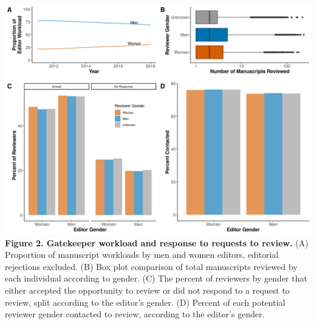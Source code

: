 \documentclass[11pt,]{article}
\begin{document}
\newpage

\includegraphics{Figure_2.png} \textbf{Figure 2. Gatekeeper workload and
response to requests to review.} (A) Proportion of manuscript workloads
by men and women editors, editorial rejections excluded. (B) Box plot
comparison of total manuscripts reviewed by each individual according to
gender. (C) The percent of reviewers by gender that either accepted the
opportunity to review or did not respond to a request to review, split
according to the editor's gender. (D) Percent of each potential reviewer
gender contacted to review, according to the editor's gender.

\newpage
\end{document}

